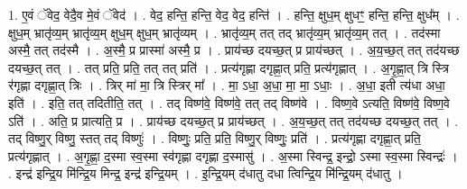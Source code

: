 \documentclass[17pt]{extarticle}
\begin{document}
1. ए॒वं ॅवेद॒ वेदै॒व मे॒वं ॅवेद॑ । . वेद॒ हन्ति॒ हन्ति॒ वेद॒ वेद॒ हन्ति॑ । . हन्ति॒ क्षुध॒म् क्षुधꣳ॒॒ हन्ति॒ हन्ति॒ क्षुध᳚म् । . क्षुध॒म् भ्रातृ॑व्य॒म् भ्रातृ॑व्य॒म् क्षुध॒म् क्षुध॒म् भ्रातृ॑व्यम् । . भ्रातृ॑व्य॒म् तत् तद् भ्रातृ॑व्य॒म् भ्रातृ॑व्य॒म् तत् । . तद॑स्मा अस्मै॒ तत् तद॑स्मै । . अ॒स्मै॒ प्र प्रास्मा॑ अस्मै॒ प्र । . प्राय॑च्छ दयच्छ॒त् प्र प्राय॑च्छत् । . अ॒य॒च्छ॒त् तत् तद॑यच्छ दयच्छ॒त् तत् । . तत् प्रति॒ प्रति॒ तत् तत् प्रति॑ । . प्रत्य॑गृह्णा दगृह्णा॒त् प्रति॒ प्रत्य॑गृह्णात् । . अ॒गृ॒ह्णा॒त् त्रि स्त्रि र॑गृह्णा दगृह्णा॒त् त्रिः । . त्रिर् मा॑ मा॒ त्रि स्त्रिर् मा᳚ । . मा॒ ऽधा॒ अ॒धा॒ मा॒ मा॒ ऽधाः॒ । . अ॒धा॒ इती त्य॑धा अधा॒ इति॑ । . इति॒ तत् तदितीति॒ तत् । . तद् विष्ण॑वे॒ विष्ण॑वे॒ तत् तद् विष्ण॑वे । . विष्ण॒वे ऽत्यति॒ विष्ण॑वे॒ विष्ण॒वे ऽति॑ । . अति॒ प्र प्रात्यति॒ प्र । . प्राय॑च्छ दयच्छ॒त् प्र प्राय॑च्छत् । . अ॒य॒च्छ॒त् तत् तद॑यच्छ दयच्छ॒त् तत् । . तद् विष्णु॒र् विष्णु॒ स्तत् तद् विष्णुः॑ । . विष्णुः॒ प्रति॒ प्रति॒ विष्णु॒र् विष्णुः॒ प्रति॑ । . प्रत्य॑गृह्णा दगृह्णा॒त् प्रति॒ प्रत्य॑गृह्णात् । . अ॒गृ॒ह्णा॒ द॒स्मा स्व॒स्मा स्व॑गृह्णा दगृह्णा द॒स्मासु॑ । . अ॒स्मा स्विन्द्र॒ इन्द्रो॒ ऽस्मा स्व॒स्मा स्विन्द्रः॑ । . इन्द्र॑ इन्द्रि॒य मि॑न्द्रि॒य मिन्द्र॒ इन्द्र॑ इन्द्रि॒यम् । . इ॒न्द्रि॒यम् द॑धातु दधा त्विन्द्रि॒य मि॑न्द्रि॒यम् द॑धातु । \newline
\end{document}
